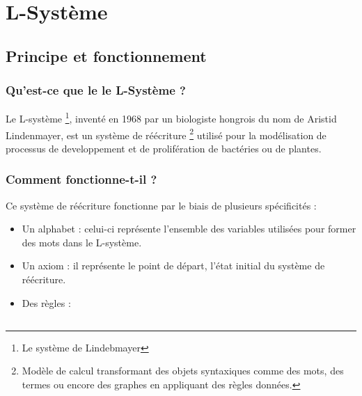 \chapter{L-Système}

\section{Principe et fonctionnement}

\subsection{Qu'est-ce que le le L-Système ?}
Le L-système \footnote{Le système de Lindebmayer}, inventé en 1968 par un biologiste hongrois du nom de Aristid Lindenmayer, est un système de réécriture \footnote{Modèle de calcul transformant des objets syntaxiques comme des mots, des termes ou encore des graphes en appliquant des règles données.} utilisé pour la modélisation de processus de developpement et de prolifération de bactéries ou de plantes.

\subsection{Comment fonctionne-t-il ?}
Ce système de réécriture fonctionne par le biais de plusieurs spécificités :
\begin{itemize}
    \item Un alphabet : celui-ci représente l'ensemble des variables utilisées pour former des mots dans le L-système.
    \item Un axiom : il représente le point de départ, l'état initial du système de réécriture.
    \item Des règles : 
\end{itemize}

\section{}